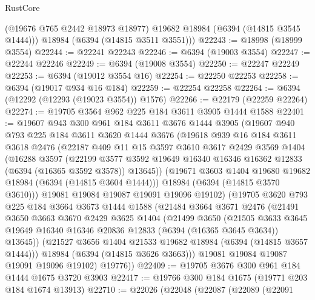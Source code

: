 \begin{lexlean}{RustCore}
\begin{coremodule}
        (@19676 @765 @2442 @18973 @18977)
        @19682
        @18984
        (@6394 (@14815 @3545 @1444)))
      @18984
      (@6394 (@14815 @3511 @3551)))
@22243 := @18998 (@18999 @3554)
@22244 := @22241 @22243
@22246 := @6394 (@19003 @3554)
@22247 := @22244 @22246
@22249 := @6394 (@19008 @3554)
@22250 := @22247 @22249
@22253 := @6394 (@19012 @3554 @16)
@22254 := @22250 @22253
@22258 := @6394 (@19017 @934 @16 @184)
@22259 := @22254 @22258
@22264 := @6394 (@12292 (@12293 (@19023 @3554)) @1576)
@22266 := @22179 (@22259 @22264)
@22274 := @19705 @3564 @962 @225 @184 @3611 @3905 @1444 @1588
@22401 := @19607
    @943
    @300
    @961
    @184
    @3611
    @3676
    @1444
    @3905
    (@19607
      @940
      @793
      @225
      @184
      @3611
      @3620
      @1444
      @3676
      (@19618
        @939
        @16
        @184
        @3611
        @3618
        @2476
        (@22187
          @409
          @11
          @15
          @3597
          @3610
          @3617
          @2429
          @3569
          @1404
          (@16288
            @3597
            (@22199
              @3577
              @3592
              @19649
              @16340
              @16346
              @16362
              @12833
              (@6394 (@16365 @3592 @3578))
              @13645))
          (@19671 @3603 @1404 @19680 @19682 @18984 (@6394 (@14815 @3604 @1444)))
          @18984
          (@6394 (@14815 @3570 @3610)))
        @19081
        @19084
        @19087
        @19091
        @19096
        @19102)
      (@19705
        @3620
        @793
        @225
        @184
        @3664
        @3673
        @1444
        @1588
        (@21484
          @3664
          @3671
          @2476
          (@21491
            @3650
            @3663
            @3670
            @2429
            @3625
            @1404
            (@21499
              @3650
              (@21505
                @3633
                @3645
                @19649
                @16340
                @16346
                @20836
                @12833
                (@6394 (@16365 @3645 @3634))
                @13645))
            (@21527 @3656 @1404 @21533 @19682 @18984 (@6394 (@14815 @3657 @1444)))
            @18984
            (@6394 (@14815 @3626 @3663)))
          @19081
          @19084
          @19087
          @19091
          @19096
          @19102)
        @19776))
@22409 := @19705 @3676 @300 @961 @184 @1444 @1675 @3720 @3903
@22417 := @19766 @300 @184 @1675 (@19771 @203 @184 @1674 @13913)
@22710 := @22026
    (@22048
      (@22087
        (@22089
          (@22091

\end{coremodule}
\end{lexlean}

